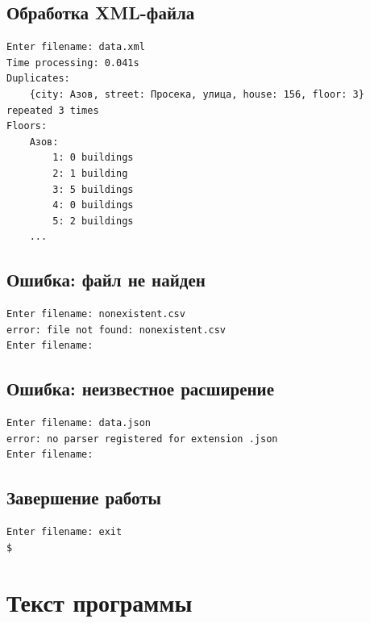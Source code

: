 \documentclass[12pt]{extarticle}
\renewcommand{\baselinestretch}{1.5}
\begin{document}
\subsection{Обработка XML-файла}

\renewcommand{\baselinestretch}{1}
\begin{lstlisting}
Enter filename: data.xml
Time processing: 0.041s
Duplicates:
    {city: Азов, street: Просека, улица, house: 156, floor: 3} repeated 3 times
Floors:
    Азов:
        1: 0 buildings
        2: 1 building
        3: 5 buildings
        4: 0 buildings
        5: 2 buildings
    ...
\end{lstlisting}
\renewcommand{\baselinestretch}{1.5}

\subsection{Ошибка: файл не найден}

\renewcommand{\baselinestretch}{1}
\begin{lstlisting}
Enter filename: nonexistent.csv
error: file not found: nonexistent.csv
Enter filename:
\end{lstlisting}
\renewcommand{\baselinestretch}{1.5}

\subsection{Ошибка: неизвестное расширение}

\renewcommand{\baselinestretch}{1}
\begin{lstlisting}
Enter filename: data.json
error: no parser registered for extension .json
Enter filename:
\end{lstlisting}
\renewcommand{\baselinestretch}{1.5}

\subsection{Завершение работы}

\renewcommand{\baselinestretch}{1}
\begin{lstlisting}
Enter filename: exit
$
\end{lstlisting}
\renewcommand{\baselinestretch}{1.5}

\section{Текст программы}
\lstset{style=coolprint}

\renewcommand{\baselinestretch}{1}
\end{document}
